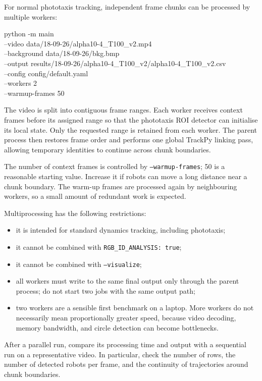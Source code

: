 \documentclass[11pt,a4paper]{article}
\begin{document}
For normal phototaxis tracking, independent frame chunks can be processed by multiple workers:

\begin{codeblock}
python -m main \\
  --video data/18-09-26/alpha10-4_T100_v2.mp4 \\
  --background data/18-09-26/bkg.bmp \\
  --output results/18-09-26/alpha10-4_T100_v2/alpha10-4_T100_v2.csv \\
  --config config/default.yaml \\
  --workers 2 \\
  --warmup-frames 50
\end{codeblock}

The video is split into contiguous frame ranges. Each worker receives context frames before its assigned range so that the phototaxis ROI detector can initialise its local state. Only the requested range is retained from each worker. The parent process then restores frame order and performs one global TrackPy linking pass, allowing temporary identities to continue across chunk boundaries.

The number of context frames is controlled by \texttt{--warmup-frames}; 50 is a reasonable starting value. Increase it if robots can move a long distance near a chunk boundary. The warm-up frames are processed again by neighbouring workers, so a small amount of redundant work is expected.

Multiprocessing has the following restrictions:

\begin{itemize}
  \item it is intended for standard dynamics tracking, including phototaxis;
  \item it cannot be combined with \texttt{RGB\_ID\_ANALYSIS: true};
  \item it cannot be combined with \texttt{--visualize};
  \item all workers must write to the same final output only through the parent process; do not start two jobs with the same output path;
  \item two workers are a sensible first benchmark on a laptop. More workers do not necessarily mean proportionally greater speed, because video decoding, memory bandwidth, and circle detection can become bottlenecks.
\end{itemize}

After a parallel run, compare its processing time and output with a sequential run on a representative video. In particular, check the number of rows, the number of detected robots per frame, and the continuity of trajectories around chunk boundaries.
\end{document}
